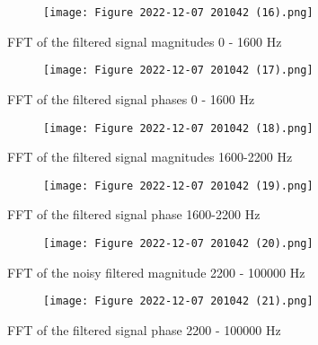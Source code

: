 \documentclass[12pt,a4paper]{article}
\begin{document}
\begin{figure}[h]
\centering
\begin{subfigure}{ 1\textwidth}
\texttt{[image: Figure 2022-12-07 201042 (16).png]}
\end{subfigure}
\caption{ FFT of the filtered signal magnitudes 0 - 1600 Hz  }
\label{fig2:image22}
\end{figure}

\begin{figure}[h]
\centering
\begin{subfigure}{ 1\textwidth}
\texttt{[image: Figure 2022-12-07 201042 (17).png]}
\end{subfigure}
\caption{ FFT of the filtered signal phases 0 - 1600 Hz  }
\label{fig2:image22}
\end{figure}

\begin{figure}[h]
\centering
\begin{subfigure}{ 1\textwidth}
\texttt{[image: Figure 2022-12-07 201042 (18).png]}
\end{subfigure}
\caption{ FFT of the filtered signal magnitudes 1600-2200 Hz  }
\label{fig2:image22}
\end{figure}

\begin{figure}[h]
\centering
\begin{subfigure}{ 1\textwidth}
\texttt{[image: Figure 2022-12-07 201042 (19).png]}
\end{subfigure}
\caption{ FFT of the filtered signal phase 1600-2200 Hz  }
\label{fig2:image22}
\end{figure}




\begin{figure}[h]
\centering
\begin{subfigure}{ 1\textwidth}
\texttt{[image: Figure 2022-12-07 201042 (20).png]}
\end{subfigure}
\caption{ FFT of the noisy filtered magnitude 2200 - 100000 Hz  }
\label{fig2:image22}
\end{figure}

\begin{figure}[h]
\centering
\begin{subfigure}{ 1\textwidth}
\texttt{[image: Figure 2022-12-07 201042 (21).png]}
\end{subfigure}
\caption{ FFT of the filtered signal phase 2200 - 100000 Hz  }
\label{fig2:image22}
\end{figure}
\clearpage
\end{document}
